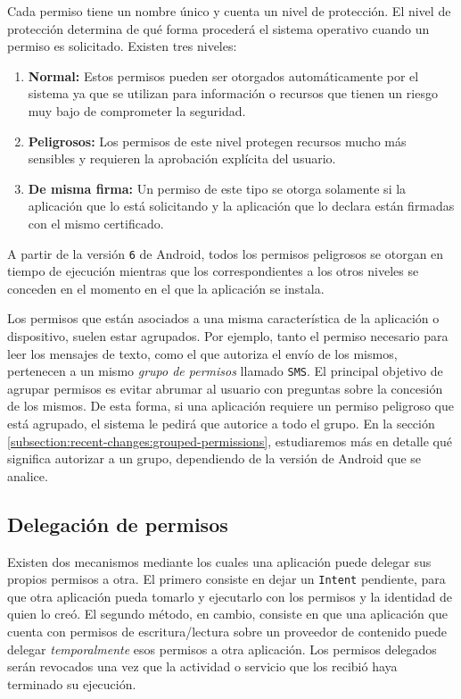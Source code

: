 Cada permiso tiene un nombre único y cuenta un nivel de protección. El nivel de protección determina
de qué forma procederá el sistema operativo cuando un permiso es solicitado. Existen tres niveles:

\begin{enumerate}
    \item \textbf{Normal:} Estos permisos pueden ser otorgados automáticamente por el sistema ya que
          se utilizan para información o recursos que tienen un riesgo muy bajo de comprometer la
          seguridad.
    \item \textbf{Peligrosos:} Los permisos de este nivel protegen recursos mucho más sensibles y
          requieren la aprobación explícita del usuario.
    \item \textbf{De misma firma:} Un permiso de este tipo se otorga solamente si la aplicación que
          lo está solicitando y la aplicación que lo declara están firmadas con el mismo
          certificado.
\end{enumerate}

A partir de la versión \texttt{6} de Android, todos los permisos peligrosos se otorgan en tiempo de
ejecución mientras que los correspondientes a los otros niveles se conceden en el momento en el que
la aplicación se instala.

Los permisos que están asociados a una misma característica de la aplicación o dispositivo,
suelen estar agrupados. Por ejemplo, tanto el permiso necesario para leer los mensajes de texto,
como el que autoriza el envío de los mismos, pertenecen a un mismo \textit{grupo de permisos}
llamado \texttt{SMS}. El principal objetivo de agrupar permisos es evitar abrumar al usuario con
preguntas sobre la concesión de los mismos. De esta forma, si una aplicación requiere un permiso
peligroso que está agrupado, el sistema le pedirá que autorice a todo el grupo. En la sección
\ref{subsection:recent-changes:grouped-permissions}, estudiaremos más en detalle qué significa
autorizar a un grupo, dependiendo de la versión de Android que se analice.

\subsection*{Delegación de permisos}
Existen dos mecanismos mediante los cuales una aplicación puede delegar sus propios permisos a otra.
El primero consiste en dejar un \texttt{Intent} pendiente, para que otra aplicación pueda tomarlo y
ejecutarlo con los permisos y la identidad de quien lo creó. El segundo método, en cambio, consiste
en que una aplicación que cuenta con permisos de escritura/lectura sobre un proveedor de contenido
puede delegar \textit{temporalmente} esos permisos a otra aplicación. Los permisos delegados serán
revocados una vez que la actividad o servicio que los recibió haya terminado su ejecución.

